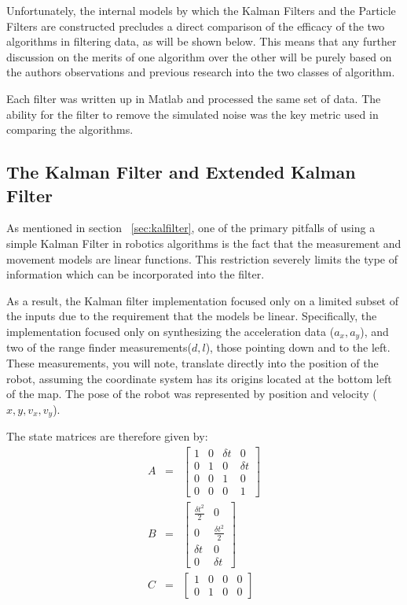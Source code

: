 \documentclass[english]{article}
\begin{document}
Unfortunately, the internal models by which the Kalman Filters and the Particle Filters are constructed precludes a direct comparison of the efficacy of the two algorithms in filtering data, as will be shown below. This means that any further discussion on the merits of one algorithm over the other will be purely based on the authors observations and previous research into the two classes of algorithm.

Each filter was written up in Matlab and processed the same set of data. The ability for the filter to remove the simulated noise was the key metric used in comparing the algorithms.

\subsection{The Kalman Filter and Extended Kalman Filter}
As mentioned in section ~\ref{sec:kalfilter}, one of the primary pitfalls of using a simple Kalman Filter in robotics algorithms is the fact that the measurement and movement models are linear functions. This restriction severely limits the type of information which can be incorporated into the filter.

As a result, the Kalman filter implementation focused only on a limited subset of the inputs due to the requirement that the models be linear. Specifically, the implementation focused only on synthesizing the acceleration data ($a_x, a_y$), and two of the range finder measurements($d, l$), those pointing down and to the left. These measurements, you will note, translate directly into the position of the robot, assuming the coordinate system has its origins located at the bottom left of the map. The pose of the robot was represented by position and velocity ($x, y, v_x, v_y$).

The state matrices are therefore given by:
\begin{eqnarray}
A &=& \left[ \begin{array}{cccc}
1 & 0 & \delta t & 0 \\
0 & 1 & 0 & \delta t \\
0 & 0 & 1 & 0 \\
0 & 0 & 0 & 1\end{array} \right] \\
B &=& \left[ \begin{array}{cc}
\frac{\delta t^2}{2} & 0 \\
0 & \frac{\delta t^2}{2} \\
\delta t & 0 \\
0 & \delta t \end{array} \right] \\
C &=& \left[ \begin{array}{cccc}
1 & 0 & 0 & 0 \\
0 & 1 & 0 & 0 \end{array} \right]
\end{eqnarray}
\end{document}
